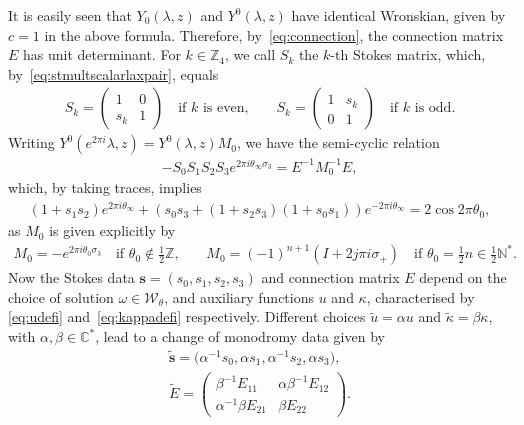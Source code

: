 \documentclass[pdftex]{sigma}
\numberwithin{equation}{section}
\newcommand{\om}{\omega}
\begin{document}
It is easily seen that $Y_{0}(\lambda,z)$ and $Y^{0}(\lambda,z)$ have identical Wronskian, given by $c=1$ in the above formula.
Therefore, by~\eqref{eq:connection}, the connection matrix $E$ has unit determinant. For $k\in\mathbb{Z}_4$, we call $S_k$ the $k$-th Stokes matrix, which, by~\eqref{eq:stmultscalarlaxpair}, equals
\begin{gather}\label{eq:stconst}
S_k=\begin{pmatrix}
1 & 0\\
s_k & 1
\end{pmatrix}\quad \text{if $k$ is even,}\qquad S_k=\begin{pmatrix}
1 & s_k\\
0 & 1
\end{pmatrix}\quad \text{if $k$ is odd.}
\end{gather}
Writing $Y^0(e^{2\pi i}\lambda,z)=Y^0(\lambda,z)M_0$, we have the semi-cyclic relation
\begin{gather}\label{eq:semi}
-S_0S_1S_2S_3e^{2\pi i \theta_\infty\sigma_3}=E^{-1}M_0^{-1}E,
\end{gather}
which, by taking traces, implies
\begin{gather}\label{eq:stcubic}
(1+s_1s_2)e^{2\pi i \theta_\infty}+(s_0s_3+(1+s_2s_3)(1+s_0s_1))e^{-2\pi i \theta_\infty}=2 \cos{2\pi \theta_0},
\end{gather}
as $M_0$ is given explicitly by
\begin{gather}\label{eq:M0defi}
M_0=-e^{2\pi i \theta_0\sigma_3}\quad \text{if $\theta_0\notin\tfrac{1}{2}\mathbb{Z}$,} \qquad
M_0=(-1)^{n+1}\left(I+2 j\pi i\sigma_+\right)\quad \text{if $\theta_0= \tfrac{1}{2}n\in \tfrac{1}{2}\mathbb{N}^*$.}
\end{gather}
Now the Stokes data $\mathbf{s}=(s_0,s_1,s_2,s_3)$ and connection matrix $E$ depend on the choice of solution $\om \in \mathcal{W}_\theta$, and auxiliary functions $u$ and $\kappa$, characterised by \eqref{eq:udefi} and~\eqref{eq:kappadefi} respectively. Dif\/ferent choices $\widetilde{u}=\alpha u$ and $\widetilde{\kappa}=\beta \kappa$, with $\alpha,\beta\in\mathbb{C}^*$, lead to a change of monodromy data given by
\begin{gather}
\widetilde{\mathbf{s}} =\big(\alpha^{-1} s_0,\alpha s_1,\alpha^{-1} s_2,\alpha s_3\big), \label{eq:stokesaction}\\
\widetilde{E} =\begin{pmatrix}
\beta^{-1} E_{11} & \alpha\beta^{-1} E_{12}\\
\alpha^{-1} \beta E_{21} & \beta E_{22}
\end{pmatrix}.\label{eq:connectionaction}
\end{gather}
\end{document}

